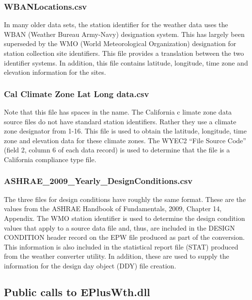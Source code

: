 \subsubsection{WBANLocations.csv}\label{wbanlocations.csv}

In many older data sets, the station identifier for the weather data uses the WBAN (Weather Bureau Army-Navy) designation system. This has largely been superseded by the WMO (World Meteorological Organization) designation for station collection site identifiers. This file provides a translation between the two identifier systems. In addition, this file contains latitude, longitude, time zone and elevation information for the sites.

\subsubsection{Cal Climate Zone Lat Long data.csv}\label{cal-climate-zone-lat-long-data.csv}

Note that this file has spaces in the name. The California c limate zone data source files do not have standard station identifiers. Rather they use a climate zone designator from 1-16. This file is used to obtain the latitude, longitude, time zone and elevation data for these climate zones. The WYEC2 ``File Source Code'' (field 2, column 6 of each data record) is used to determine that the file is a California compliance type file.

\subsubsection{ASHRAE\_2009\_Yearly\_DesignConditions.csv}\label{ashraeux5f2009ux5fyearlyux5fdesignconditions.csv}

The three files for design conditions have roughly the same format. These are the values from the ASHRAE Handbook of Fundamentals, 2009, Chapter 14, Appendix. The WMO station identifier is used to determine the design condition values that apply to a source data file and, thus, are included in the DESIGN CONDITION header record on the EPW file produced as part of the conversion. This information is also included in the statistical report file (STAT) produced from the weather converter utility. In addition, these are used to supply the information for the design day object (DDY) file creation.

\subsection{Public calls to EPlusWth.dll}\label{public-calls-to-epluswth.dll}

